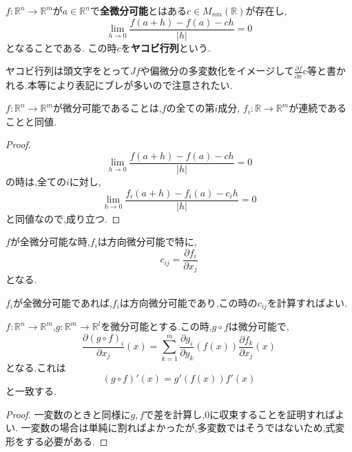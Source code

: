 \begin{screen}
\begin{dfn}
$f: \mathbb{R}^n \to \mathbb{R}^m$が$a \in \mathbb{R}^n$で\textbf{全微分可能}とはある$c \in M_{nm}(\mathbb{R})$が存在し,
\begin{equation*}
    \lim_{h \to 0}\frac{f(a+h) - f(a) - ch}{|h|} = 0
\end{equation*}
となることである.
この時$c$を\textbf{ヤコビ行列}という.
\end{dfn}
\end{screen}

\begin{rem}
ヤコビ行列は頭文字をとって$Jf$や偏微分の多変数化をイメージして$\frac{\partial f}{\partial x}$c等と書かれる.本等により表記にブレが多いので注意されたい.
\end{rem}

\begin{lem}
$f: \mathbb{R}^n \to \mathbb{R}^m$が微分可能であることは,$f$の全ての第$i$成分,
$f_i: \mathbb{R} \to \mathbb{R}^m$が連続であることと同値.
\end{lem}
\begin{proof}
\begin{equation*}
    \lim_{h \to 0}\frac{f(a+h) - f(a) - ch}{|h|} = 0
\end{equation*}
の時は,全ての$i$に対し,
\begin{equation*}
    \lim_{h \to 0}\frac{f_i(a+h) - f_i(a) - c_ih}{|h|} = 0
\end{equation*}
と同値なので,成り立つ.
\end{proof}

\begin{lem}
$f$が全微分可能な時,$f_i$は方向微分可能で特に,
\begin{equation*}
    c_{ij} = \frac{\partial f_i}{\partial x_j}
\end{equation*}
となる.
\end{lem}
$f_i$が全微分可能であれば,$f_i$は方向微分可能であり,この時の$c_{ij}$を計算すればよい.

\begin{thm}
$f: \mathbb{R}^n \to \mathbb{R}^m$,$g:\mathbb{R}^m \to \mathbb{R}^l$を微分可能とする.この時,$g \circ f$は微分可能で,
\begin{equation*}
    \frac{\partial (g \circ f)_i}{\partial x_j}(x) = \sum_{k=1}^m \frac{\partial g_i}{\partial y_k}(f(x)) \frac{\partial f_k}{\partial x_j}(x)
\end{equation*}
となる.これは
\begin{equation*}
    (g \circ f)'(x) = g'(f(x)) f'(x)
\end{equation*}
と一致する.
\end{thm}
\begin{proof}
一変数のときと同様に$g,f$で差を計算し,0に収束することを証明すればよい.
一変数の場合は単純に割ればよかったが,多変数ではそうではないため,式変形をする必要がある.
\end{proof}


